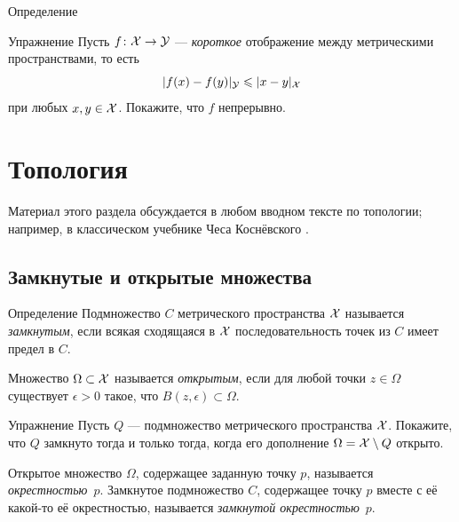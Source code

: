 {\begin{thm}{Определение}
\end{thm}

\begin{thm}{Упражнение}\label{ex:shrt=>continuous}
Пусть $f\:\spc{X}\z\to \spc{Y}$ --- \emph{короткое} отображение между метрическими пространствами, то есть
\[\dist{f(x)}{f(y)}{\spc{Y}}\le \dist{x}{y}{\spc{X}}\]
при любых $x,y\in \mathcal{X}$.
Покажите, что $f$ непрерывно.
\end{thm}


\spell{\end{multicols}}{}

\section{Топология}\label{sec:topology}

Материал этого раздела обсуждается в любом вводном тексте по топологии;
например, в классическом учебнике Чеса Коснёвского \cite{kosniowski}.


\subsection*{Замкнутые и открытые множества}

\begin{thm}{Определение}
Подмножество $C$ метрического пространства $\mathcal{X}$ называется \emph{замкнутым}, если всякая сходящаяся в $\mathcal{X}$ последовательность точек из $C$ имеет предел в $C$.

Множество $\Omega \subset \mathcal{X}$ называется \emph{открытым}, если для любой точки $z\in \Omega$ 
существует $\epsilon>0$ такое, что $B(z,\epsilon)\subset\Omega$.
\end{thm}

\begin{thm}{Упражнение}\label{ex:close-open}
Пусть $Q$ --- подмножество метрического пространства $\mathcal{X}$.
Покажите, что $Q$ замкнуто тогда и только тогда, когда его дополнение $\Omega=\mathcal{X}\setminus Q$ открыто.
\end{thm}

Открытое множество $\Omega$, содержащее заданную точку $p$, называется \emph{окрестностью}~$p$.
Замкнутое подмножество $C$, содержащее точку $p$ вместе с её какой-то её окрестностью, называется \emph{замкнутой окрестностью}~$p$.

}
